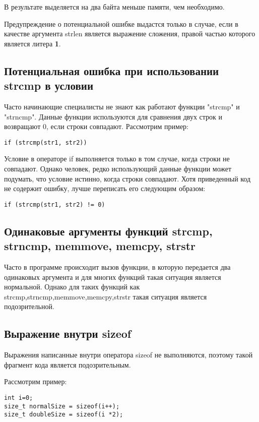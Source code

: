 В результате выделяется на два байта меньше памяти, чем необходимо. 

Предупреждение о потенциальной ошибке выдастся только в случае, если в качестве аргумента
strlen является выражение сложения, правой частью которого является литера \textbf{1}.

\subsection{Потенциальная ошибка при использовании strcmp в условии}
\label{sec:strcmp}
Часто начинающие специалисты не знают как работают функции "strcmp" и "strncmp".
Данные функции используются для сравнения двух строк и возвращают 0, если строки совпадают.
Рассмотрим пример:
\begin{lstlisting}
if (strcmp(str1, str2))
\end{lstlisting}
 
Условие в операторе if выполняется только в том случае, когда строки не совпадают. Однако человек,
редко использующий данные функции может подумать, что условие истинно, когда строки совпадают.
Хотя приведенный код не содержит ошибку, лучше переписать его следующим образом:
\begin{lstlisting}
if (strcmp(str1, str2) != 0)
\end{lstlisting}

\subsection{Одинаковые аргументы функций strcmp, strncmp, memmove, memcpy, strstr}
\label{sec:eqArgs}
Часто в программе происходит вызов функции, в которую передается два одинаковых аргумента и для
многих функций такая ситуация является нормальной. Однако для таких функций как strcmp,strncmp,memmove,memcpy,strstr
такая ситуация является подозрительной.

\subsection{Выражение внутри sizeof}
\label{sec:sizeof}
Выражения написанные внутри оператора sizeof не выполняются, поэтому такой фрагмент кода является подозрительным.

Рассмотрим пример:
\begin{lstlisting}
int i=0;
size_t normalSize = sizeof(i++);
size_t doubleSize = sizeof(i *2);
\end{lstlisting}

